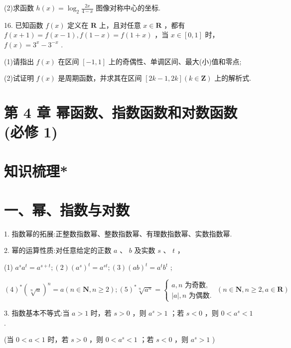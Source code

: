 (2)求函数 $h\left( x\right)  = {\log }_{2}\frac{2x}{4 - x}$ 图像对称中心的坐标.

16. 已知函数 $f\left( x\right)$ 定义在 $\mathbf{R}$ 上，且对任意 $x \in  \mathbf{R}$ ，都有 $f\left( {x + 1}\right)  = f\left( {x - 1}\right) ,f\left( {1 - x}\right)  = f\left( {1 + x}\right)$ ，当 $x \in  \left\lbrack  {0,1}\right\rbrack$ 时， $f\left( x\right)  = {3}^{x} - {3}^{-x}$ .

(1)请指出 $f\left( x\right)$ 在区间 $\left\lbrack  {-1,1}\right\rbrack$ 上的奇偶性、单调区间、最大(小)值和零点;

(2)试证明 $f\left( x\right)$ 是周期函数，并求其在区间 $\left\lbrack  {{2k} - 1,{2k}}\right\rbrack  \left( {k \in  \mathbf{Z}}\right)$ 上的解析式.

\section*{第 4 章 幂函数、指数函数和对数函数(必修 1)}

\section*{知识梳理*}

\section*{一、幂、指数与对数}

1. 指数幂的拓展:正整数指数幂、整数指数幂、有理数指数幂、实数指数幂.

2. 幂的运算性质:对任意给定的正数 $a$ 、 $b$ 及实数 $s$ 、 $t$ ，

(1) ${a}^{s}{a}^{t} = {a}^{s + t};\left( 2\right) {\left( {a}^{s}\right) }^{t} = {a}^{st};\left( 3\right) {\left( ab\right) }^{t} = {a}^{t}{b}^{t}$ ;

${\left( 4\right) }^{ * }{\left( \sqrt[n]{a}\right) }^{n} = a\left( {n \in  \mathbf{N},n \geq  2}\right) ;{\left( 5\right) }^{ * }\sqrt[n]{{a}^{n}} = \left\{  {\begin{array}{l} a,n\text{ 为奇数, } \\  \left| a\right| ,n\text{ 为偶数. } \end{array}\left( {n \in  \mathbf{N},n \geq  2,a \in  \mathbf{R}}\right) }\right.$

3. 指数基本不等式:当 $a > 1$ 时，若 $s > 0$ ，则 ${a}^{s} > 1$ ；若 $s < 0$ ，则 $0 < {a}^{s} < 1$ .

(当 $0 < a < 1$ 时，若 $s > 0$ ，则 $0 < {a}^{s} < 1$ ；若 $s < 0$ ，则 ${a}^{s} > 1$ )

